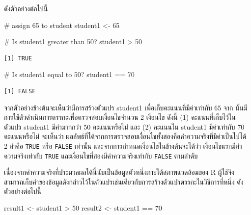 \documentclass[
  a4paper,
]{book}
\newenvironment{Shaded}{\begin{snugshade}}{\end{snugshade}}
\newcommand{\CommentTok}[1]{\textcolor[rgb]{0.37,0.37,0.37}{#1}}
\newcommand{\DecValTok}[1]{\textcolor[rgb]{0.68,0.00,0.00}{#1}}
\newcommand{\NormalTok}[1]{\textcolor[rgb]{0.00,0.23,0.31}{#1}}
\newcommand{\OtherTok}[1]{\textcolor[rgb]{0.00,0.23,0.31}{#1}}
\newcommand{\SpecialCharTok}[1]{\textcolor[rgb]{0.37,0.37,0.37}{#1}}
\begin{document}
ดังตัวอย่างต่อไปนี้

\begin{Shaded}
\begin{Highlighting}[]
\CommentTok{\# assign 65 to student}
\NormalTok{student1 }\OtherTok{\textless{}{-}} \DecValTok{65} 
\end{Highlighting}
\end{Shaded}

\begin{Shaded}
\begin{Highlighting}[]
\CommentTok{\# Is student1 greater than 50?}
\NormalTok{student1 }\SpecialCharTok{\textgreater{}} \DecValTok{50} 
\end{Highlighting}
\end{Shaded}

\begin{verbatim}
[1] TRUE
\end{verbatim}

\begin{Shaded}
\begin{Highlighting}[]
\CommentTok{\# Is student1 equal to 50?}
\NormalTok{student1 }\SpecialCharTok{==} \DecValTok{70} 
\end{Highlighting}
\end{Shaded}

\begin{verbatim}
[1] FALSE
\end{verbatim}

จากตัวอย่างข้างต้นจะเห็นว่ามีการสร้างตัวแปร student1 เพื่อเก็บคะแนนที่มีค่าเท่ากับ 65 จาก
นั้นมีการใช้ตัวดำเนินการตรรกะเพื่อตรวจสอบเงื่อนไขจำนวน 2 เงื่อนไข ดังนี้ (1)
คะแนนที่เก็บไว้ในตัวแปร student1 มีค่ามากกว่า 50 คะแนนหรือไม่ และ (2) คะแนนใน
student1 มีค่าเท่ากับ 70 คะแนนหรือไม่ จะเห็นว่า
ผลลัพธ์ที่ได้จากการตรวจสอบเงื่อนไขทั้งสองคือค่าความจริงที่มีค่าเป็นไปได้ 2 ค่าคือ
\texttt{TRUE} หรือ \texttt{FALSE} เท่านั้น และจากการกำหนดเงื่อนไขในข้างต้นจะได้ว่า
เงื่อนไขแรกมีค่าความจริงเท่ากับ \texttt{TRUE} และเงื่อนไขที่สองมีค่าความจริงเท่ากับ
\texttt{FALSE} ตามลำดับ

เนื่องจากค่าความจริงที่ประมวลผลได้นี้นับเป็นข้อมูลตัวหนึ่งภายใต้สภาพแวดล้อมของ R
ผู้ใช้จึงสามารถเก็บค่าของข้อมูลดังกล่าวไว้ในตัวแปรเช่นเดียวกับการสร้างตัวแปรตรรกะในวิธีการที่หนึ่ง
ดังตัวอย่างต่อไปนี้

\begin{Shaded}
\begin{Highlighting}[]
\NormalTok{result1 }\OtherTok{\textless{}{-}}\NormalTok{ student1 }\SpecialCharTok{\textgreater{}} \DecValTok{50}
\NormalTok{result2 }\OtherTok{\textless{}{-}}\NormalTok{ student1 }\SpecialCharTok{==} \DecValTok{70}
\end{Highlighting}
\end{Shaded}
\end{document}
